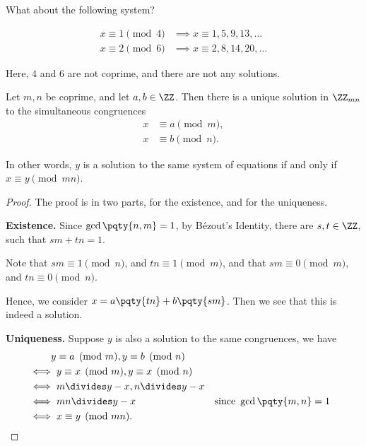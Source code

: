 What about the following system?

\begin{align*}
    x \equiv 1 \pmod{4} &\implies x \equiv 1, 5, 9, 13, \ldots \\
    x \equiv 2 \pmod{6} &\implies x \equiv 2, 8, 14, 20, \ldots
\end{align*}

Here, \(4\) and \(6\) are not coprime, and there are not any solutions.

\begin{theorem}
    Let \(m, n\) be coprime, and let \(a, b \in \ZZ\). Then there is a unique solution in \(\ZZ_{mn}\) to the simultaneous congruences
    \begin{align*}
        x &\equiv a \pmod{m}, \\
        x &\equiv b \pmod{n}.
    \end{align*}

    In other words, \(y\) is a solution to the same system of equations if and only if \(x \equiv y \pmod{mn}\).
\end{theorem}

\begin{proof}
    The proof is in two parts, for the existence, and for the uniqueness.

    \textbf{Existence.} Since \(\gcd\pqty{n, m} = 1\), by B\'{e}zout's Identity, there are \(s, t \in \ZZ\), such that \(sm + tn = 1\).

    Note that \(sm \equiv 1 \pmod{n}\), and \(tn \equiv 1 \pmod{m}\), and that \(sm \equiv 0 \pmod{m}\), and \(tn \equiv 0 \pmod{n}\).

    Hence, we consider \(x = a \pqty{tn} + b \pqty{sm}\). Then we see that this is indeed a solution.

    \textbf{Uniqueness.} Suppose \(y\) is also a solution to the same congruences, we have
    \begin{align*}
        &\phantom{\iff} y \equiv a \pmod{m}, y \equiv b \pmod{n} \\
        &\iff y \equiv x \pmod{m}, y \equiv x \pmod{n} \\
        &\iff m \divides y - x, n \divides y - x \\
        &\iff mn \divides y - x && \text{since } \gcd\pqty{m, n} = 1 \\
        &\iff x \equiv y \pmod{mn}.
    \end{align*}
\end{proof}

